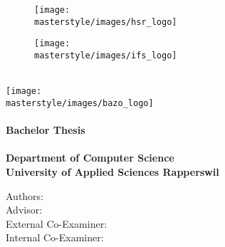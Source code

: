 \begin{titlepage}
\begin{flushleft}

\begin{figure}[tbp]
  \begin{minipage}[c]{0.4\textwidth}
    \texttt{[image: \\masterstyle/images/hsr\_logo]}
  \end{minipage}
  \hfill
  \begin{minipage}[c]{0.3\textwidth}
    \texttt{[image: \\masterstyle/images/ifs\_logo]}
  \end{minipage}
\end{figure}

\noindent\begin{minipage}[t]{0.49\textwidth}
  \begin{flushleft}
    \vspace{0pt}
  \end{flushleft}
\end{minipage}
\hfill
\begin{minipage}[t]{0.49\textwidth}
  \begin{flushright}
    \vspace{0pt}
  \end{flushright}
\end{minipage}
\\[4cm]

\texttt{[image: \\masterstyle/images/bazo\_logo]}\\[1cm]
{\Huge \bfseries \TITLE}\\[1cm]
{\huge \bfseries Bachelor Thesis}\\[0.7cm]
{\large \bfseries \SEMESTER}\\[0.3cm]
{\large \bfseries Department of Computer Science}\\
{\large \bfseries University of Applied Sciences Rapperswil}\\

\vfill

Authors: \AUTHOR \\
Advisor: \SUPERVISOR \\
External Co-Examiner: \EXPERTE \\
Internal Co-Examiner: \GEGENLESER \\

\end{flushleft}
\end{titlepage}
